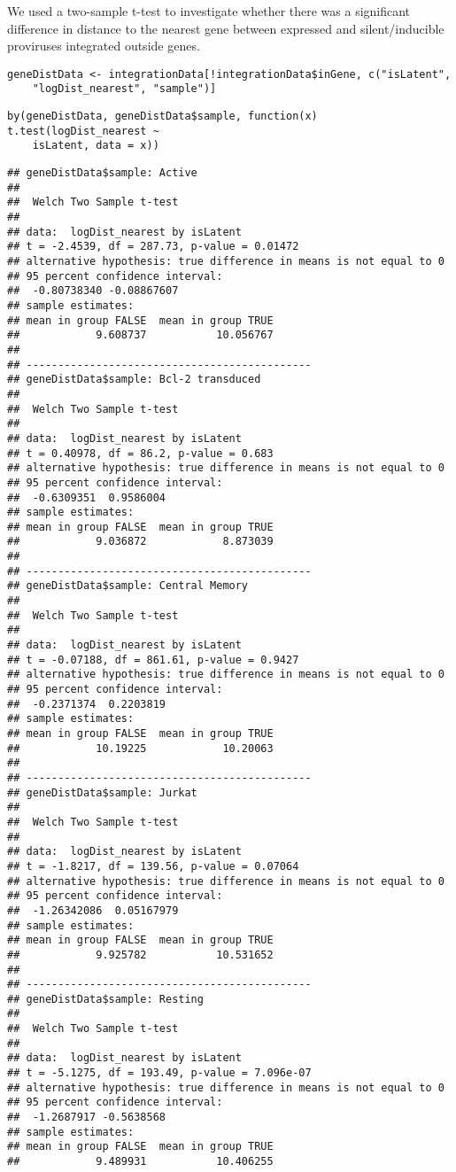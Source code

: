 \documentclass[../../sherrill-Mix_thesis.tex]{subfiles}
\makeatletter
\newenvironment{kframe}{%
 \def\at@end@of@kframe{}%
 \ifinner\ifhmode%
  \def\at@end@of@kframe{\end{minipage}}%
  \begin{minipage}{\columnwidth}%
 \fi\fi%
 \def\FrameCommand##1{\hskip\@totalleftmargin \hskip-\fboxsep
 \colorbox{shadecolor}{##1}\hskip-\fboxsep
     \hskip-\linewidth \hskip-\@totalleftmargin \hskip\columnwidth}%
 \MakeFramed {\advance\hsize-\width
   \@totalleftmargin\z@ \linewidth\hsize
   \@setminipage}}%
 {\par\unskip\endMakeFramed%
 \at@end@of@kframe}
\newenvironment{knitrout}{}{} %
\makeatother
\begin{document}
We used a two-sample t-test to investigate whether there was a significant difference in distance to the nearest gene between expressed and silent/inducible proviruses integrated outside genes.
\begin{knitrout}
\color{fgcolor}\begin{kframe}
\begin{lstlisting}[basicstyle=\ttfamily,breaklines=true]
geneDistData <- integrationData[!integrationData$inGene, c("isLatent", 
    "logDist_nearest", "sample")]\end{lstlisting}
\begin{lstlisting}[basicstyle=\ttfamily,breaklines=true]
by(geneDistData, geneDistData$sample, function(x) t.test(logDist_nearest ~ 
    isLatent, data = x))\end{lstlisting}
\begin{lstlisting}[basicstyle=\ttfamily,breaklines=true]
## geneDistData$sample: Active
## 
## 	Welch Two Sample t-test
## 
## data:  logDist_nearest by isLatent
## t = -2.4539, df = 287.73, p-value = 0.01472
## alternative hypothesis: true difference in means is not equal to 0
## 95 percent confidence interval:
##  -0.80738340 -0.08867607
## sample estimates:
## mean in group FALSE  mean in group TRUE 
##            9.608737           10.056767 
## 
## --------------------------------------------- 
## geneDistData$sample: Bcl-2 transduced
## 
## 	Welch Two Sample t-test
## 
## data:  logDist_nearest by isLatent
## t = 0.40978, df = 86.2, p-value = 0.683
## alternative hypothesis: true difference in means is not equal to 0
## 95 percent confidence interval:
##  -0.6309351  0.9586004
## sample estimates:
## mean in group FALSE  mean in group TRUE 
##            9.036872            8.873039 
## 
## --------------------------------------------- 
## geneDistData$sample: Central Memory
## 
## 	Welch Two Sample t-test
## 
## data:  logDist_nearest by isLatent
## t = -0.07188, df = 861.61, p-value = 0.9427
## alternative hypothesis: true difference in means is not equal to 0
## 95 percent confidence interval:
##  -0.2371374  0.2203819
## sample estimates:
## mean in group FALSE  mean in group TRUE 
##            10.19225            10.20063 
## 
## --------------------------------------------- 
## geneDistData$sample: Jurkat
## 
## 	Welch Two Sample t-test
## 
## data:  logDist_nearest by isLatent
## t = -1.8217, df = 139.56, p-value = 0.07064
## alternative hypothesis: true difference in means is not equal to 0
## 95 percent confidence interval:
##  -1.26342086  0.05167979
## sample estimates:
## mean in group FALSE  mean in group TRUE 
##            9.925782           10.531652 
## 
## --------------------------------------------- 
## geneDistData$sample: Resting
## 
## 	Welch Two Sample t-test
## 
## data:  logDist_nearest by isLatent
## t = -5.1275, df = 193.49, p-value = 7.096e-07
## alternative hypothesis: true difference in means is not equal to 0
## 95 percent confidence interval:
##  -1.2687917 -0.5638568
## sample estimates:
## mean in group FALSE  mean in group TRUE 
##            9.489931           10.406255
\end{lstlisting}
\end{kframe}
\end{knitrout}
\end{document}
